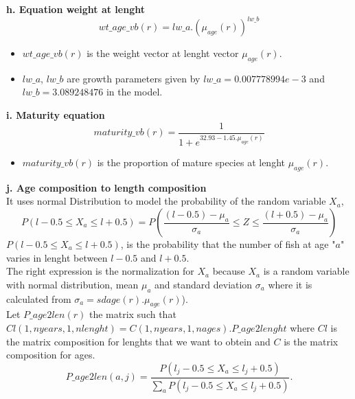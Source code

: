 \documentclass{article}
\begin{document}
\hfill

\textbf{h. Equation weight at lenght}\\
\begin{equation}
     wt\_age\_vb(r) = lw\_a . \left(\mu_{age}(r)\right)^{lw\_b}
 \end{equation}
 \begin{itemize}
     \item $wt\_age\_vb(r)$ is the weight vector at lenght vector $\mu_{age}(r)$.
     \item $lw\_a$, $lw\_b$ are growth parameters given by  $lw\_a=0.007778994e-3$ and $lw\_b=3.089248476$ in the model.
 \end{itemize}

\hfill

\textbf{i. Maturity equation}\\
 \begin{equation}
    maturity\_vb(r) = \dfrac{1}{1+e^{32.93-1.45.\mu_{age}(r)}}
\end{equation}
\begin{itemize}
    \item $maturity\_vb(r)$ is the proportion of mature species at lenght $\mu_{age}(r)$.
\end{itemize}

\hfill

\textbf{j. Age composition to length composition}\\

It uses normal Distribution to model the probability of the random variable $X_a$, 
\begin{equation}
    P(l-0.5\leq X_a\leq l+0.5 ) = P\left(\dfrac{(l-0.5)-\mu_a}{\sigma_a}\leq Z\leq\dfrac{(l+0.5)-\mu_a}{\sigma_a}\right)
\end{equation}
$P(l-0.5\leq X_a\leq l+0.5 )$, is the probability that the number of fish at age "$a$" varies in lenght between  $l-0.5$ and $l+0.5$. \\
The right expression is the normalization for $X_a$ because $X_a$ is a random variable with normal distribution, mean $\mu_a$ and  standard deviation $\sigma_a$ where it is calculated from $\sigma_{a}=sdage(r).\mu_{age}(r)$).\\
Let $P\_age2len(r)$ the matrix such that $Cl(1,nyears,1,nlenght)=C(1,nyears,1,nages).P\_age2lenght$ where $Cl$ is the matrix composition for lenghts that we want to obtein and $C$ is the matrix composition for ages.
\begin{equation}
    P\_age2len(a,j) = \dfrac{P(l_j-0.5\leq X_a\leq l_j+0.5 )}{\sum_{a}P(l_j-0.5\leq X_a\leq l_j+0.5 )}.
\end{equation}
\end{document}
